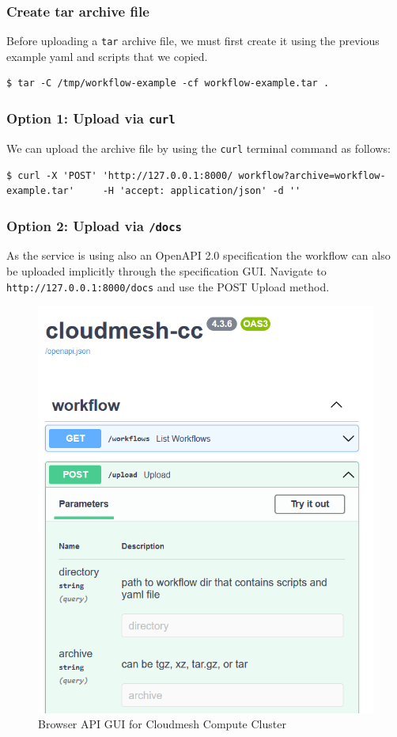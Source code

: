 \subsubsection{Create tar archive file}\label{create-tar-archive-file}

Before uploading a \texttt{tar} archive file, we must first create it
using the previous example yaml and scripts that we copied.

\smallskip
\begin{verbatim}
$ tar -C /tmp/workflow-example -cf workflow-example.tar .
\end{verbatim}
\smallskip

\subsubsection{\texorpdfstring{Option 1: Upload via
\texttt{curl}}{Option 1: Upload via curl}}\label{option-1-upload-via-curl}

We can upload the archive file by using the \texttt{curl} terminal
command as follows:

\smallskip
\begin{verbatim}
$ curl -X 'POST' 'http://127.0.0.1:8000/ workflow?archive=workflow-example.tar'     -H 'accept: application/json' -d ''
\end{verbatim}
\smallskip

\subsubsection{\texorpdfstring{Option 2: Upload via
\texttt{/docs}}{Option 2: Upload via /docs}}\label{option-2-upload-via-docs}

As the service is using also an OpenAPI 2.0 specification the workflow
can also be uploaded implicitly through the specification GUI. Navigate
to \texttt{http://127.0.0.1:8000/docs} and use the POST Upload method.

\begin{figure}
\centering
\includegraphics[width=0.7\columnwidth]{images/upload_api.png}
\caption{Browser API GUI for Cloudmesh Compute Cluster}
\end{figure}


